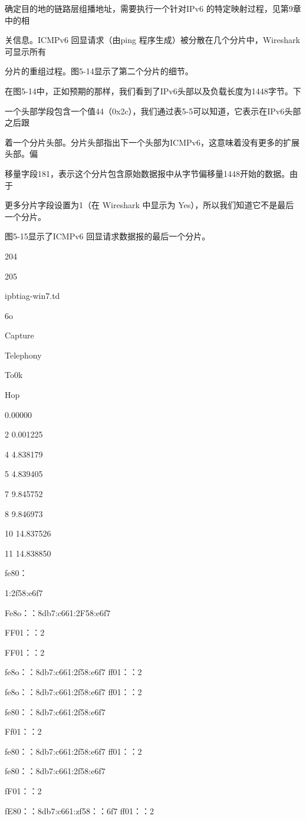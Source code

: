 确定目的地的链路层组播地址，需要执行一个针对IPv6 的特定映射过程，见第9章中的相

关信息。ICMPv6 回显请求（由ping 程序生成）被分散在几个分片中，Wireshark 可显示所有

分片的重组过程。图5-14显示了第二个分片的细节。

在图5-14中，正如预期的那样，我们看到了IPv6头部以及负载长度为1448字节。下

一个头部学段包含一个值44（0x2c），我们通过表5-5可以知道，它表示在IPv6头部之后跟

着一个分片头部。分片头部指出下一个头部为ICMPv6，这意味着没有更多的扩展头部。偏

移量字段181，表示这个分片包含原始数据报中从字节偏移量1448开始的数据。由于

更多分片字段设置为1（在 Wireshark 中显示为 Yes），所以我们知道它不是最后一个分片。

图5-15显示了ICMPv6 回显请求数据报的最后一个分片。

204

205

ipbtiag-win7.td

6o

Capture

Telephony

To0k

Hop

0.00000

2 0.001225

4 4.838179

5 4.839405

7 9.845752

8 9.846973

10 14.837526

11 14.838850

fe80：

1:2f58:e6f7

Fe8o：：8db7:c661:2F58:e6f7

FF01：：2

FF01：：2

fe8o：：8db7:c661:2f58:e6f7 ff01：：2

fe8o：：8db7:c661:2f58:e6f7 ff01：：2

fe80：：8db7:c661:2f58:e6f7

Ff01：：2

fe80：：8db7:c661:2f58:e6f7 ff01：：2

fe80：：8db7:c661:2f58:e6f7

fF01：：2

fE80：：8db7:c661:zf58：：6f7 ff01：：2

